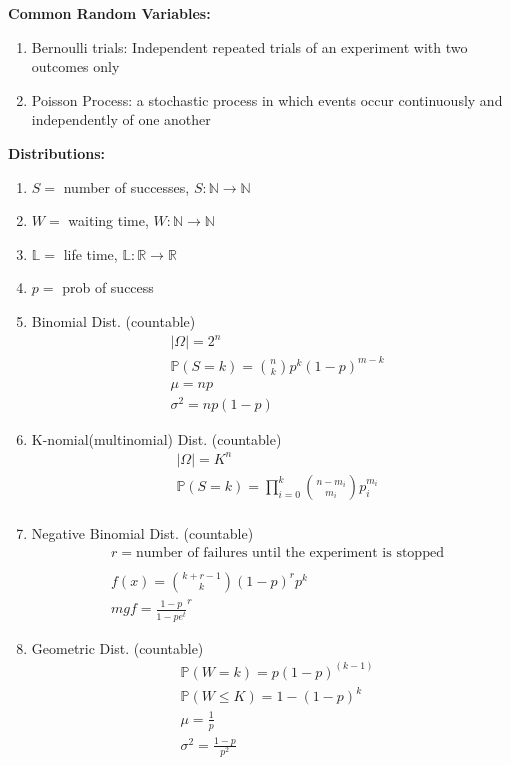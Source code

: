 \documentclass[12pt]{article}
\newcommand{\abs}[1]{\left| #1 \right|} %
\renewcommand{\=}[1]{\stackrel{#1}{=}} %
\theoremstyle{definition}
\theoremstyle{remark}
\begin{document}
\newpage
\textbf{Common Random Variables:}
\begin{enumerate}
\item Bernoulli trials: Independent repeated trials of an experiment with two outcomes only
\item Poisson Process: a stochastic process in which events occur continuously and independently of one another 
\end{enumerate}


\textbf{Distributions:}
\begin{enumerate}
\item $S = $ number of successes, $S: \mathbb{N} \rightarrow \mathbb{N}$
\item $W=$ waiting time, $W:\mathbb{N} \rightarrow \mathbb{N}$
\item $\mathbb{L}=$ life time, $\mathbb{L}: \mathbb{R} \rightarrow
  \mathbb{R}$
\item $p=$ prob of success
\item Binomial Dist. (countable)
  \begin{align*}
    &\abs{\Omega} = 2^n \\
    &\mathbb{P}(S = k) = \binom{n}{k} p^k(1-p)^{m-k} \\
    &\mu = np \\
    &\sigma^2 = np(1-p)
  \end{align*}
\item K-nomial(multinomial) Dist. (countable)
  \begin{align*}
    &\abs{\Omega} = K^n \\
    &\mathbb{P}(S = k) = \prod_{i=0}^k \binom{n-m_i}{m_i} p_i^{m_i} \\
  \end{align*}
\item Negative Binomial Dist. (countable)
  \begin{align*}
    &r=\textrm{number of failures until the experiment is stopped} \\ \\
    &f(x) = \binom{k+r-1}{k}(1-p)^rp^k \\
    &mgf = \frac{1-p}{1-p e^t}^r
  \end{align*}
\item Geometric Dist. (countable)
  \begin{align*}
    &\mathbb{P}(W=k)=p(1-p)^{(k-1)} \\
    &\mathbb{P}(W\leq K) = 1-(1-p)^k \\
    &\mu = \frac{1}{p} \\
    &\sigma^2= \frac{1-p}{p^2}

\end{align*}
\end{enumerate}
\end{document}
